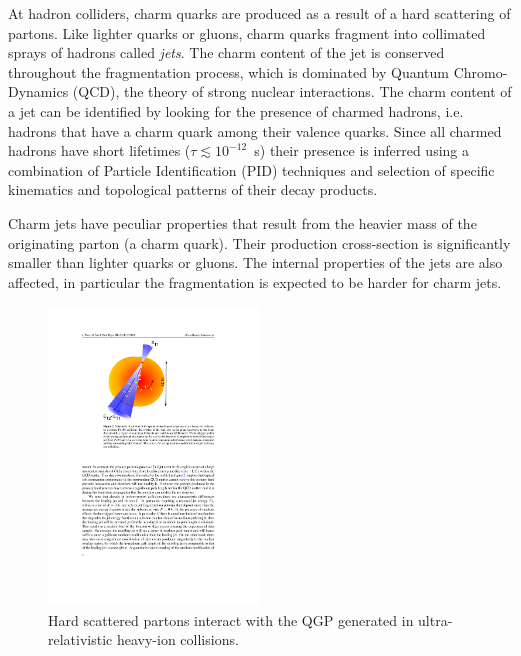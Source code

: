 \documentclass[12pt, a4paper, twoside, titlepage]{article}
\begin{document}
At hadron colliders, charm quarks are produced as a result of a hard scattering of partons. Like lighter quarks or gluons, charm quarks
fragment into collimated sprays of hadrons called \emph{jets}. The charm content of the jet is conserved throughout the fragmentation process,
which is dominated by Quantum Chromo-Dynamics (QCD), the theory of strong nuclear interactions.
The charm content of a jet can be identified by looking for the presence of charmed hadrons, i.e. hadrons that have
a charm quark among their valence quarks. Since all charmed hadrons have short lifetimes ($\tau \lesssim 10^{-12}$~s) their presence is inferred
using a combination of Particle Identification (PID) techniques and selection of specific kinematics and topological patterns of their decay products.

Charm jets have peculiar properties that result from the heavier mass of the originating parton (a charm quark).
Their production cross-section is significantly smaller than lighter quarks or gluons. The internal
properties of the jets are also affected, in particular the fragmentation is expected to be harder for charm jets.

\begin{figure}[tbh]
\begin{center}
\includegraphics[width=0.5\textwidth]{img/jetquenching}
 \caption{Hard scattered partons interact with the QGP generated in ultra-relativistic heavy-ion collisions.} 
 \label{fig:jetquenching}
\end{center}
\end{figure}
\end{document}
